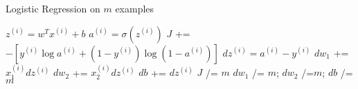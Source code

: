 \documentclass[10pt,twocolumn]{article}
\begin{document}

\begin{algorithm}
  \caption{Logistic Regression on $m$ examples}
  \begin{algorithmic}[1]
        \State $z^{(i)} = w^T x^{(i)} + b$
        \State $a^{(i)} = \sigma(z^{(i)})$ 
        \State $J$ += $-[y^{(i)} \log a^{(i)} + (1-y^{(i)}) \log(1-a^{(i)})]$   
        \State $dz^{(i)} = a^{(i)} - y^{(i)}$ 
        \State $dw_1$ += $x_1^{(i)} dz^{(i)}$
        \State $dw_2$ += $x_2^{(i)} dz^{(i)}$
        \State $db$ += $dz^{(i)}$
    \EndFor
    \State $J$ /= $m$
    \State $dw_1$ /= $m$; $dw_2$ /=$m$; $db$ /= $m$
  \end{algorithmic}
\end{algorithm}
\end{document}
